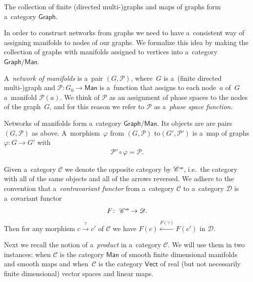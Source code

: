 \documentclass[10pt,a4paper]{amsart}
\numberwithin{equation}{section}
\newcommand{\op}[1]{{#1}^{\mbox{\sf{\tiny{op}}}}}
\begin{document}
\begin{Remark}
The collection of f\/inite (directed multi-)graphs and maps of graphs form a~category $\mathsf{Graph}$.
\end{Remark}

In order to construct networks from graphs we need to have a~consistent way of assigning manifolds to nodes of our
graphs.
We formalize this idea by making the collection of graphs with manifolds assigned to vertices into a~category
$\mathsf{Graph}/\mathsf{Man}$.

\begin{Definition}\label{def.network.mfld}
A~{\it network of manifolds} is a~pair $(G,{\mathcal P})$, where~$G$
is a~(f\/inite directed multi-)graph and ${\mathcal P}\colon G_0 \to \mathsf{Man}$ is a~function that assigns to each node~$a$ of~$G$
a~manifold ${\mathcal P}(a)$.
We think of ${\mathcal P}$ as an assignment of phase spaces to the nodes of the graph~$G$, and for this reason we refer
to ${\mathcal P}$ as a~{\em phase space function.}

Networks of manifolds form a~category $\mathsf{Graph}/\mathsf{Man}$.
Its objects are are pairs $(G,{\mathcal P})$ as above.
A~morphism~$\varphi$ from $(G,{\mathcal P})$ to$(G',{\mathcal P}')$ is a~map of graphs $\varphi\colon G\to G'$ with
\begin{gather*}
{\mathcal P}'\circ \varphi = {\mathcal P}.
\end{gather*}
\end{Definition}

\begin{Notation}
Given a~category $\mathscr{C}$ we denote the opposite category by $\op{\mathscr{C}}$, i.e.~the category with all of the
same objects and all of the arrows reversed.
We adhere to the convention that a~{\em contravariant functor} from a~category $\mathscr{C}$ to a~category $\mathscr{D}$
is a~covariant functor
\begin{gather*}
F\colon \ \op{\mathscr{C}}\to \mathscr{D}.
\end{gather*}
Then for any morphism $c\xrightarrow{\gamma}c'$ of $\mathscr{C}$ we have $F(c)\xleftarrow{F(\gamma)}F(c')$ in
$\mathscr{D}$.
\end{Notation}

Next we recall the notion of a~{\em product} in a~category $\mathscr{C}$.
We will use them in two instances: when $\mathscr{C}$ is the category $\mathsf{Man}$ of smooth f\/inite dimensional
manifolds and smooth maps and when~$\mathscr{C}$ is the category $\mathsf{Vect}$ of real (but not necessarily f\/inite
dimensional) vector spaces and linear maps.
\end{document}
